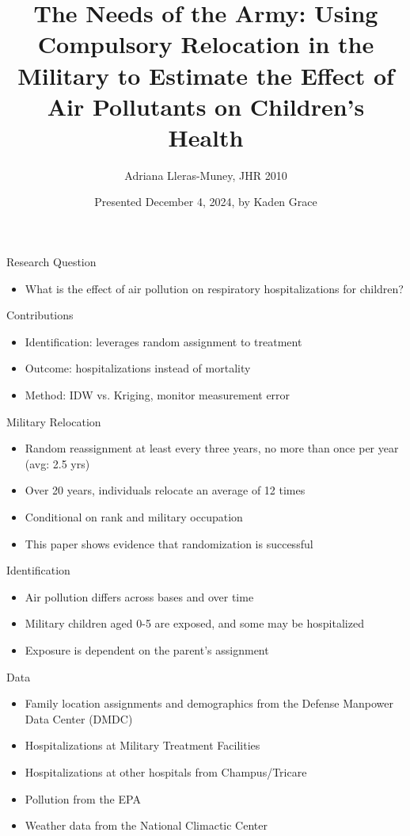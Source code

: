\documentclass{beamer}
\title[Army Relocation \& Air Pollution] %
{\small The Needs of the Army: Using Compulsory Relocation in the Military to Estimate the Effect of Air Pollutants on Children's Health} %
\author[Grace] %
{Adriana Lleras-Muney, JHR 2010} %
\date{Presented December 4, 2024, by Kaden Grace}
\institute{}
\begin{document}
\begin{frame}
\titlepage
\end{frame}


\begin{frame}{Research Question}
    \begin{itemize}
        \item What is the effect of air pollution on respiratory hospitalizations for children?
    \end{itemize}
\end{frame}

\begin{frame}{Contributions}
    \begin{itemize}
        \item Identification: leverages random assignment to treatment
        \item Outcome: hospitalizations instead of mortality
        \item Method: IDW vs. Kriging, monitor measurement error
    \end{itemize}
\end{frame}

\begin{frame}{Military Relocation}
    \begin{itemize}
        \item Random reassignment at least every three years, no more than once per year (avg: 2.5 yrs)
        \item Over 20 years, individuals relocate an average of 12 times
        \item Conditional on rank and military occupation
        \item This paper shows evidence that randomization is successful 
    \end{itemize}
\end{frame}

\begin{frame}{Identification}
    \begin{itemize}
        \item Air pollution differs across bases and over time
        \item Military children aged 0-5 are exposed, and some may be hospitalized
        \item Exposure is dependent on the parent's assignment
    \end{itemize}
\end{frame}

\begin{frame}{Data}
\begin{itemize}
    \item Family location assignments and demographics from the Defense Manpower Data Center (DMDC)
    \item Hospitalizations at Military Treatment Facilities 
    \item Hospitalizations at other hospitals from Champus/Tricare
    \item Pollution from the EPA
    \item Weather data from the National Climactic Center
\end{itemize}
\end{frame}
\end{document}
